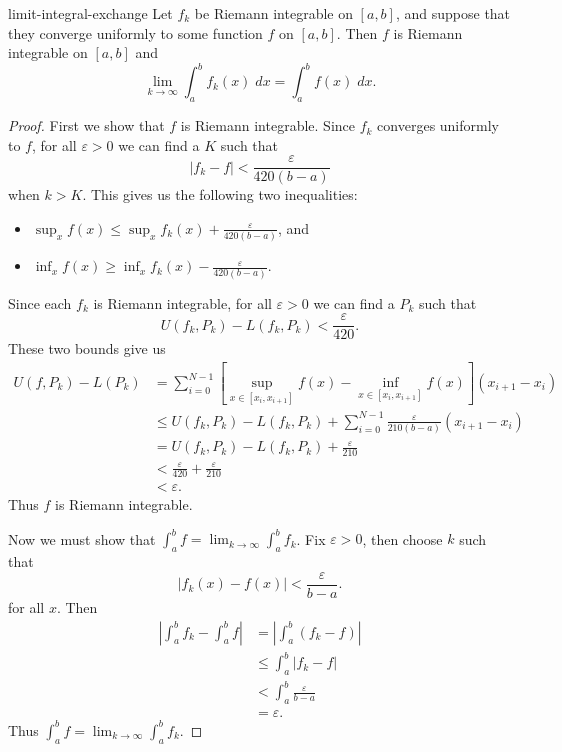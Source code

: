 \documentclass[10pt]{report}
\begin{document}
\begin{thrm}{}{limit-integral-exchange}
	Let $f_k$ be Riemann integrable on $[a,b] $, and suppose that they converge uniformly to some function $f$ on $[a,b]$. Then $f$ is Riemann integrable on $[a,b]$ and
	\[
		\lim_{k \to \infty} \int_{a}^{b} f_k(x) \;dx = \int_{a}^{b} f(x)\;dx.
	\] 
\end{thrm}
\begin{proof}
	First we show that $f$ is Riemann integrable. Since $f_k$ converges uniformly to $f$, for all $\varepsilon>0$ we can find a $K$ such that
	\[
		|f_k - f| < \frac{\varepsilon}{420 (b-a)} 
	\] when $k > K$. This gives us the following two inequalities:
	\begin{itemize}
		\item $\sup_x f(x) \leq \sup_x f_k(x) + \frac{\varepsilon}{420 (b-a)}$, and
		\item $\inf_x f(x) \geq \inf_x f_k(x) - \frac{\varepsilon}{420 (b-a)} $.
	\end{itemize}
	Since each $f_k$ is Riemann integrable, for all $\varepsilon>0$ we can find a $P_k$ such that
	\[
		U(f_k, P_k) - L(f_k, P_k) < \frac{\varepsilon}{420} .
	\] These two bounds give us
	\begin{align*}
		U(f, P_k) - L(P_k) &= \sum_{i=0}^{N-1} \left[ \sup_{x \in [x_i, x_{i+1}]} f(x) - \inf_{x \in [x_i, x_{i+1}]} f(x) \right] (x_{i+1}-x_i) \\
				   &\leq U(f_k, P_k) - L(f_k, P_k) + \sum_{i=0}^{N-1} \frac{\varepsilon}{210 (b-a)} (x_{i+1}-x_i) \\
				   &= U(f_k, P_k) - L(f_k, P_k) + \frac{\varepsilon}{210} \\
				   &< \frac{\varepsilon}{420} + \frac{\varepsilon}{210} \\
				   &< \varepsilon.
	\end{align*}
	Thus $f$ is Riemann integrable.

	Now we must show that $\int_{a}^{b} f = \lim_{k \to \infty} \int_{a}^{b} f_k$. Fix $\varepsilon>0$, then choose $k$ such that
	\[
		|f_k(x)-f(x)| < \frac{\varepsilon}{b-a}.
	\] for all $x$. Then
	\begin{align*}
		\left| \int_{a}^{b} f_k - \int_{a}^{b} f \right| &= \left| \int_{a}^{b} (f_k-f) \right| \\
								 &\leq \int_{a}^{b} |f_k-f| \\
								 &< \int_{a}^{b} \frac{\varepsilon}{b-a} \\
								 &= \varepsilon.
	\end{align*}
	Thus $\int_{a}^{b} f = \lim_{k \to \infty} \int_{a}^{b} f_k$.
\end{proof}
\end{document}
